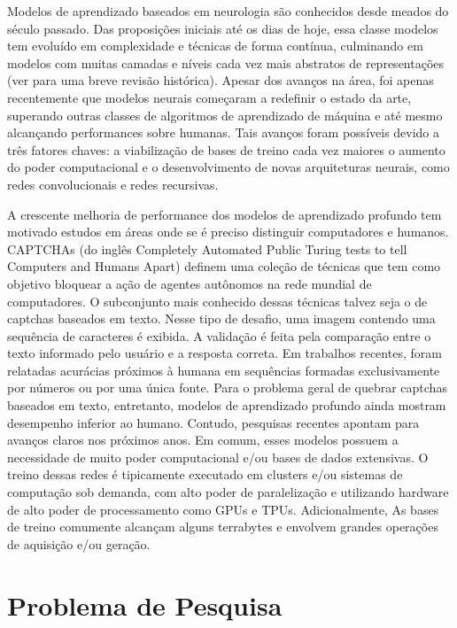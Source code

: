 \documentclass[openany, a4paper,12pt, oneside]{article}
\begin{document}
Modelos de aprendizado baseados em neurologia são conhecidos desde meados do século passado\cite{perceptron_58}. Das proposições iniciais até os dias de hoje, essa classe modelos tem evoluído em complexidade e técnicas de forma contínua,
culminando em modelos com muitas camadas e níveis cada vez mais abstratos de representações (ver \cite{Goodfellow-et-al-2016} para uma breve revisão histórica).
Apesar dos avanços na área, foi apenas recentemente que modelos neurais 
começaram a redefinir o estado da arte, superando outras classes de algoritmos de aprendizado de máquina\cite{imagenet_2012}
e até mesmo alcançando performances sobre humanas\cite{mnih2015humanlevel}.
Tais avanços foram possíveis devido a três fatores chaves: a viabilização de bases de treino
cada vez maiores o aumento do poder computacional e o desenvolvimento de novas arquiteturas neurais, como redes convolucionais e redes recursivas.

A crescente melhoria de performance dos modelos de aprendizado profundo tem motivado
estudos em áreas onde se é preciso distinguir computadores e humanos. CAPTCHAs \cite{captcha_2003} (do inglês Completely
Automated  Public  Turing  tests  to  tell  Computers  and
Humans Apart) definem uma coleção de técnicas que tem como objetivo bloquear a 
ação de agentes autônomos na rede mundial de computadores. O subconjunto mais conhecido dessas técnicas talvez seja o de captchas baseados em texto\cite{captcha_review_2017}. 
Nesse tipo de desafio, uma imagem contendo uma sequência de caracteres é exibida.
A validação é feita pela comparação entre o texto informado pelo usuário e a resposta
correta. Em trabalhos recentes, foram relatadas acurácias próximos à humana em sequências formadas exclusivamente por números\cite{captcha_break_2013} ou por uma única fonte\cite{captcha_break_2017}. Para o problema geral de 
quebrar captchas baseados em texto, entretanto, modelos de aprendizado profundo ainda mostram
desempenho inferior ao humano. Contudo, pesquisas recentes apontam para avanços claros nos próximos anos\cite{Bursztein2014TheEI}. Em comum, esses modelos possuem a 
necessidade de muito poder computacional e/ou bases de dados extensivas.
O treino dessas redes é tipicamente executado em clusters e/ou sistemas de computação sob demanda, com alto poder de paralelização e utilizando hardware de alto poder de processamento como GPUs e TPUs. Adicionalmente, As bases de treino comumente alcançam alguns terrabytes e envolvem grandes operações de aquisição e/ou geração.


\section{Problema de Pesquisa}
\end{document}
